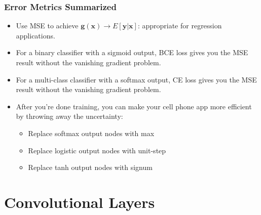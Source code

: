 \documentclass{beamer}
\begin{document}
\begin{frame}
  \frametitle{Error Metrics Summarized}
  \begin{itemize}
    \item Use MSE to achieve $\mathbf{g}(\mathbf{x})\rightarrow
      E\left[\mathbf{y}|\mathbf{x}\right]$: appropriate for regression applications.
    \item For a binary classifier with a sigmoid output, BCE loss gives you
      the MSE result without the vanishing gradient problem.
    \item For a multi-class classifier with a softmax output, CE loss gives you
      the MSE result without the vanishing gradient problem.
    \item After you're done training, you can make your cell phone app
      more efficient by throwing away the uncertainty:
      \begin{itemize}
      \item Replace softmax output nodes with max
      \item Replace logistic output nodes with unit-step
      \item Replace tanh output nodes with signum
      \end{itemize}
  \end{itemize}
\end{frame}

\section[Convolution]{Convolutional Layers}
\setcounter{subsection}{1}
\end{document}
